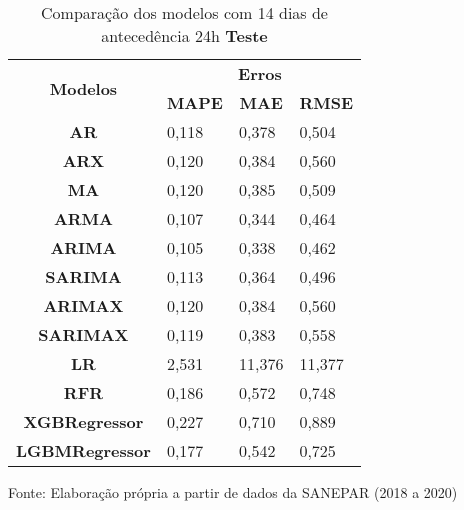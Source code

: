 \begin{table}[H]
	\centering
	\caption{Comparação dos modelos com 14 dias de antecedência 24h \textbf{Teste} }\label{tb:30-24tst}
	\begin{tabular}{@{}clll@{}}
		\toprule
		\multirow{2}{*}{\textbf{Modelos}} & \multicolumn{3}{c}{\textbf{Erros}}                                                                       \\ \cmidrule(l){2-4} 
		& \multicolumn{1}{c}{\textbf{MAPE}} & \multicolumn{1}{c}{\textbf{MAE}} & \multicolumn{1}{c}{\textbf{RMSE}} \\ \hline
\textbf{AR}                       & 0,118                             & 0,378                            & 0,504                             \\
\textbf{ARX}                      & 0,120                             & 0,384                            & 0,560                             \\
\textbf{MA}                       & 0,120                             & 0,385                            & 0,509                             \\
\textbf{ARMA}                     & 0,107                             & 0,344                            & 0,464                             \\
\textbf{ARIMA}                    & 0,105                             & 0,338                            & 0,462                             \\
\textbf{SARIMA}                   & 0,113                             & 0,364                            & 0,496                             \\
\textbf{ARIMAX}                   & 0,120                             & 0,384                            & 0,560                             \\
\textbf{SARIMAX}                  & 0,119                             & 0,383                            & 0,558                             \\
\textbf{LR}                       & 2,531                             & 11,376                           & 11,377                            \\
\textbf{RFR}                      & 0,186                             & 0,572                            & 0,748                             \\
\textbf{XGBRegressor}             & 0,227                             & 0,710                            & 0,889                             \\
\textbf{LGBMRegressor}            & 0,177                             & 0,542                            & 0,725                             \\ \bottomrule
	\end{tabular}

Fonte: Elaboração própria a partir de dados da SANEPAR (2018 a 2020)
\end{table}

